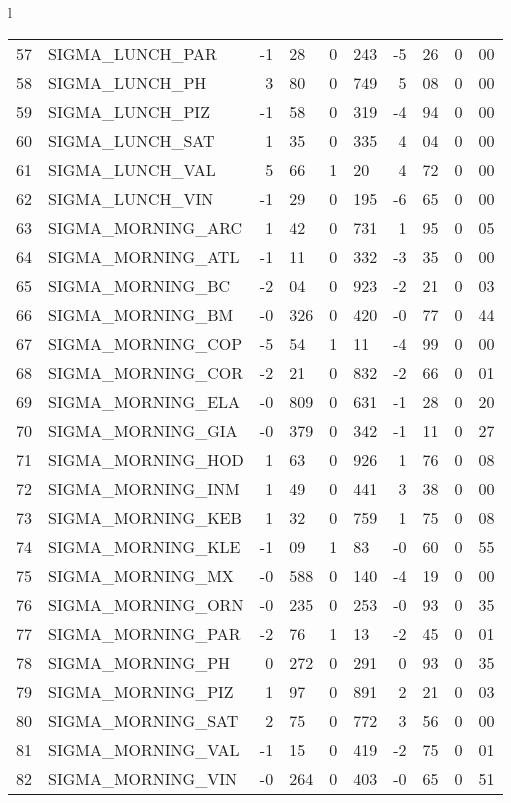 \begin{tabular}{l}
\begin{tabular}{rlr@{.}lr@{.}lr@{.}lr@{.}l}
57 & SIGMA_LUNCH_PAR  & -1&28 & 0&243 & -5&26 & 0&00\\
58 & SIGMA_LUNCH_PH  & 3&80 & 0&749 & 5&08 & 0&00\\
59 & SIGMA_LUNCH_PIZ  & -1&58 & 0&319 & -4&94 & 0&00\\
60 & SIGMA_LUNCH_SAT  & 1&35 & 0&335 & 4&04 & 0&00\\
61 & SIGMA_LUNCH_VAL  & 5&66 & 1&20 & 4&72 & 0&00\\
62 & SIGMA_LUNCH_VIN & -1&29 & 0&195 & -6&65 & 0&00\\
63 & SIGMA_MORNING_ARC & 1&42 & 0&731 & 1&95 & 0&05\\
64 & SIGMA_MORNING_ATL  & -1&11 & 0&332 & -3&35 & 0&00\\
65 & SIGMA_MORNING_BC & -2&04 & 0&923 & -2&21 & 0&03\\
66 & SIGMA_MORNING_BM & -0&326 & 0&420 & -0&77 & 0&44\\
67 & SIGMA_MORNING_COP & -5&54 & 1&11 & -4&99 & 0&00\\
68 & SIGMA_MORNING_COR  & -2&21 & 0&832 & -2&66 & 0&01\\
69 & SIGMA_MORNING_ELA & -0&809 & 0&631 & -1&28 & 0&20\\
70 & SIGMA_MORNING_GIA  & -0&379 & 0&342 & -1&11 & 0&27\\
71 & SIGMA_MORNING_HOD  & 1&63 & 0&926 & 1&76 & 0&08\\
72 & SIGMA_MORNING_INM  & 1&49 & 0&441 & 3&38 & 0&00\\
73 & SIGMA_MORNING_KEB  & 1&32 & 0&759 & 1&75 & 0&08\\
74 & SIGMA_MORNING_KLE & -1&09 & 1&83 & -0&60 & 0&55\\
75 & SIGMA_MORNING_MX  & -0&588 & 0&140 & -4&19 & 0&00\\
76 & SIGMA_MORNING_ORN  & -0&235 & 0&253 & -0&93 & 0&35\\
77 & SIGMA_MORNING_PAR  & -2&76 & 1&13 & -2&45 & 0&01\\
78 & SIGMA_MORNING_PH  & 0&272 & 0&291 & 0&93 & 0&35\\
79 & SIGMA_MORNING_PIZ  & 1&97 & 0&891 & 2&21 & 0&03\\
80 & SIGMA_MORNING_SAT  & 2&75 & 0&772 & 3&56 & 0&00\\
81 & SIGMA_MORNING_VAL  & -1&15 & 0&419 & -2&75 & 0&01\\
82 & SIGMA_MORNING_VIN & -0&264 & 0&403 & -0&65 & 0&51\\
\hline
\end{tabular}
\\
\begin{tabular}{rcl}

\end{tabular}
\end{tabular}
